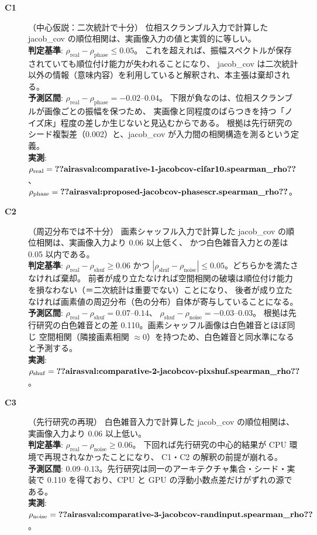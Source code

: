 \documentclass[11pt]{article}
\providecommand{\airasval}[1]{\textbf{??airasval:\detokenize{#1}??}}
\providecommand{\unverified}[1]{#1}
\begin{document}
\begin{description}

\item[\textbf{C1}]（中心仮説：二次統計で十分）
位相スクランブル入力で計算した jacob\_cov の順位相関は、実画像入力の値と実質的に等しい。\\
\textbf{判定基準}: $\rho_{\mathrm{real}} - \rho_{\mathrm{phase}} \le 0.05$。
これを超えれば、振幅スペクトルが保存されていても順位付け能力が失われることになり、
jacob\_cov は二次統計以外の情報（意味内容）を利用していると解釈され、本主張は棄却される。\\
\textbf{予測区間}: $\rho_{\mathrm{real}} - \rho_{\mathrm{phase}} = -0.02$--$0.04$。
下限が負なのは、位相スクランブルが画像ごとの振幅を保つため、
実画像と同程度のばらつきを持つ「ノイズ床」程度の差しか生じないと見込むからである。
根拠は先行研究のシード複製差（\unverified{0.002}）と、jacob\_cov が入力間の相関構造を測るという定義。\\
\textbf{実測}: $\rho_{\mathrm{real}} = \airasval{comparative-1-jacobcov-cifar10.spearman_rho}$、
$\rho_{\mathrm{phase}} = \airasval{proposed-jacobcov-phasescr.spearman_rho}$。

\item[\textbf{C2}]（周辺分布では不十分）
画素シャッフル入力で計算した jacob\_cov の順位相関は、実画像入力より 0.06 以上低く、
かつ白色雑音入力との差は 0.05 以内である。\\
\textbf{判定基準}: $\rho_{\mathrm{real}} - \rho_{\mathrm{shuf}} \ge 0.06$ かつ
$|\rho_{\mathrm{shuf}} - \rho_{\mathrm{noise}}| \le 0.05$。どちらかを満たさなければ棄却。
前者が成り立たなければ空間相関の破壊は順位付け能力を損なわない（＝二次統計は重要でない）ことになり、
後者が成り立たなければ画素値の周辺分布（色の分布）自体が寄与していることになる。\\
\textbf{予測区間}: $\rho_{\mathrm{real}} - \rho_{\mathrm{shuf}} = 0.07$--$0.14$、
$\rho_{\mathrm{shuf}} - \rho_{\mathrm{noise}} = -0.03$--$0.03$。
根拠は先行研究の白色雑音との差 \unverified{0.110}。画素シャッフル画像は白色雑音とほぼ同じ
空間相関（隣接画素相関 $\approx 0$）を持つため、白色雑音と同水準になると予測する。\\
\textbf{実測}: $\rho_{\mathrm{shuf}} = \airasval{comparative-2-jacobcov-pixshuf.spearman_rho}$。

\item[\textbf{C3}]（先行研究の再現）
白色雑音入力で計算した jacob\_cov の順位相関は、実画像入力より 0.06 以上低い。\\
\textbf{判定基準}: $\rho_{\mathrm{real}} - \rho_{\mathrm{noise}} \ge 0.06$。
下回れば先行研究の中心的結果が CPU 環境で再現されなかったことになり、
C1・C2 の解釈の前提が崩れる。\\
\textbf{予測区間}: $0.09$--$0.13$。先行研究は同一のアーキテクチャ集合・シード・実装で
\unverified{0.110} を得ており、CPU と GPU の浮動小数点差だけがずれの源である。\\
\textbf{実測}: $\rho_{\mathrm{noise}} = \airasval{comparative-3-jacobcov-randinput.spearman_rho}$。


\end{description}
\end{document}
